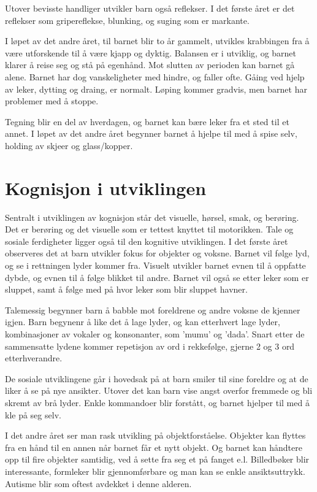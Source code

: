 \documentclass[12pt, a4paper]{article}
\begin{document}
Utover bevisste handliger utvikler barn også reflekser. I det første året er
det reflekser som gripereflekse, blunking, og suging som er markante.  

I løpet av det andre året, til barnet blir to år gammelt, utvikles krabbingen
fra å være utforskende til å være kjapp og dyktig. Balansen er i utviklig, og
barnet klarer å reise seg og stå på egenhånd. Mot slutten av perioden kan
barnet gå alene. Barnet har dog vanskeligheter med hindre, og faller ofte. 
Gåing ved hjelp av leker, dytting og draing, er normalt. Løping kommer gradvis,
men barnet har problemer med å stoppe. 

Tegning blir en del av hverdagen, og barnet kan bære leker fra et sted til et
annet. I løpet av det andre året begynner barnet å hjelpe til med å spise selv,
holding av skjeer og glass/kopper.  

\section{Kognisjon i utviklingen} %
Sentralt i utviklingen av kognisjon står det visuelle, hørsel, smak, og
berøring. Det er berøring og det visuelle som er tettest knyttet til
motorikken. Tale og sosiale ferdigheter ligger også til den kognitive
utviklingen.   
I det første året observeres det at barn utvikler fokus for objekter og voksne.
Barnet vil følge lyd, og se i rettningen lyder kommer fra. Visuelt utvikler
barnet evnen til å oppfatte dybde, og evnen til å følge blikket til andre.
Barnet vil også se etter leker som er sluppet, samt å følge med på hvor leker
som blir sluppet havner.   

Talemessig begynner barn å babble mot foreldrene og andre voksne de kjenner
igjen. Barn begynenr å like det å lage lyder, og kan etterhvert lage lyder,
kombinasjoner av vokaler og konsonanter, som 'mumu' og 'dada'. Snart etter de
sammensatte lydene kommer repetisjon av ord i rekkefølge, gjerne 2 og 3  ord
etterhverandre. 

De sosiale utviklingene går i hovedsak på at barn smiler til sine foreldre og
at de liker å se på nye ansikter. Utover det kan barn vise angst overfor
fremmede og bli skremt av brå lyder. Enkle kommandoer blir forstått, og barnet
hjelper til med å kle på seg selv.  

I det andre året ser man rask utvikling på objektforståelse. Objekter kan
flyttes fra en hånd til en annen når barnet får et nytt objekt. Og barnet kan
håndtere opp til fire objekter samtidig, ved å sette fra seg et på fanget e.l. 
Billedbøker blir interessante, formleker blir gjennomførbare og man kan se enkle
ansiktsuttrykk. Autisme blir som oftest avdekket i denne alderen. 
\end{document}
